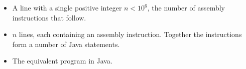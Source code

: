 \Input
\begin{itemize}
 \item A line with a single positive integer $n < 10^6$, the number of assembly instructions that follow.
 \item $n$ lines, each containing an assembly instruction. Together the instructions form a number of Java statements.
\end{itemize}

\Output
\begin{itemize}
 \item The equivalent program in Java.
\end{itemize}

\ExampleSpecialForLicht
